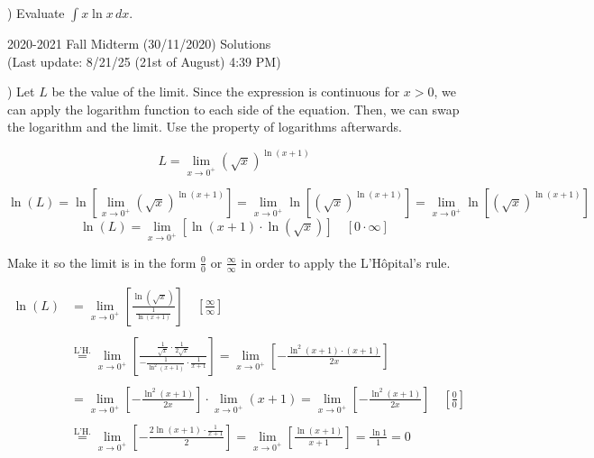 \documentclass{article}
\begin{document}
\hfill

) Evaluate $\displaystyle \int x\ln x \, dx$.

\hfill

\newpage

\begin{center}
2020-2021 Fall Midterm (30/11/2020) Solutions\\
(Last update: 8/21/25 (21st of August) 4:39 PM)
\end{center}

) Let $L$ be the value of the limit. Since the expression is continuous for $x>0$, we can apply the logarithm function to each side of the equation. Then, we can swap the logarithm and the limit. Use the property of logarithms afterwards.

\[L=\lim_{x\to0^+} \left(\sqrt x\right)^{\ln\left(x+1\right)}\]

\[\ln(L)=\ln\left[\lim_{x\to0^+} \left(\sqrt x\right)^{\ln\left(x+1\right)}\right] = \lim_{x\to0^+} \ln\left[\left(\sqrt x\right)^{\ln\left(x+1\right)}\right] = \lim_{x\to0^+} \ln\left[\left(\sqrt x\right)^{\ln\left(x+1\right)}\right] \]
\[\ln\left(L\right) = \lim_{x\to0^+} \left[\ln\left(x+1\right)\cdot\ln\left(\sqrt x\right)\right] \quad\left[0\cdot\infty\right]\]

\hfill

\noindent Make it so the limit is in the form $\displaystyle \frac00$ or $\displaystyle \frac\infty\infty$ in order to apply the L'Hôpital's rule.

\begin{align*}\ln\left(L\right) &= \lim_{x\to0^+} \left[\frac{\ln\left(\sqrt x\right)}{\frac1{\ln\left(x+1\right)}}\right] \quad\left[\frac\infty\infty\right]\\\\&\overset{\text{L'H.}}{=}\lim_{x\to0^+} \left[\frac{\frac1{\sqrt x}\cdot\frac1{2\sqrt x}}{-\frac1{\ln^2\left(x+1\right)}\cdot \frac1{x+1}}\right] = \lim_{x\to0^+} \left[-\frac{\ln^2(x+1)\cdot(x+1)}{2x}\right]\\\\&=\lim_{x\to0^+} \left[-\frac{\ln^2(x+1)}{2x}\right] \cdot\lim_{x\to0^+} \left(x+1\right)=\lim_{x\to0^+} \left[-\frac{\ln^2(x+1)}{2x}\right]\quad\left[\frac00\right]\\\\&\overset{\text{L'H.}}{=}\lim_{x\to0^+} \left[-\frac{2\ln(x+1) \cdot\frac1{x+1}}2\right]=\lim_{x\to0^+} \left[\frac{\ln(x+1)}{x+1}\right] = \frac{\ln1}{1}=0\end{align*}
\end{document}
